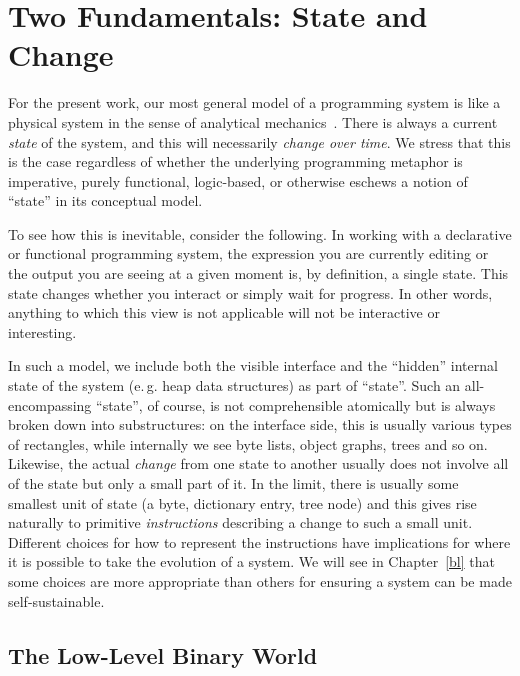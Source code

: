 \documentclass[ twoside,openright,titlepage,numbers=noenddot,headinclude,footinclude,cleardoublepage=empty,abstract=on,
                BCOR=5mm,paper=a4,fontsize=11pt
                ]{scrreprt}
\newcommand{\eg}{e.\,g.}
\theoremstyle{definition}
\begin{document}
\hypertarget{two-fundamentals-state-and-change}{\section{Two Fundamentals: State and
Change}\label{two-fundamentals-state-and-change}}

For the present work, our most general model of a programming system is
like a physical system in the sense of analytical
mechanics~\parencite{SICM}. There is always a current \emph{state} of
the system, and this will necessarily \emph{change over time}. We stress
that this is the case regardless of whether the underlying programming
metaphor is imperative, purely functional, logic-based, or otherwise
eschews a notion of ``state'' in its conceptual model.

To see how this is inevitable, consider the following. In working with a
declarative or functional programming system, the expression you are
currently editing or the output you are seeing at a given moment is, by
definition, a single state. This state changes whether you interact or
simply wait for progress. In other words, anything to which this view is
not applicable will not be interactive or interesting.

In such a model, we include both the visible interface and the
``hidden'' internal state of the system (\eg{} heap data structures) as
part of ``state''. Such an all-encompassing ``state'', of course, is not
comprehensible atomically but is always broken down into substructures:
on the interface side, this is usually various types of rectangles,
while internally we see byte lists, object graphs, trees and so on.
Likewise, the actual \emph{change} from one state to another usually
does not involve all of the state but only a small part of it. In the
limit, there is usually some smallest unit of state (a byte, dictionary
entry, tree node) and this gives rise naturally to primitive
\emph{instructions} describing a change to such a small unit. Different
choices for how to represent the instructions have implications for
where it is possible to take the evolution of a system. We will see in
Chapter~\ref{bl} that some choices are more appropriate than others for
ensuring a system can be made self-sustainable.

\hypertarget{the-low-level-binary-world}{\subsection{The Low-Level Binary
World}\label{the-low-level-binary-world}}
\end{document}
